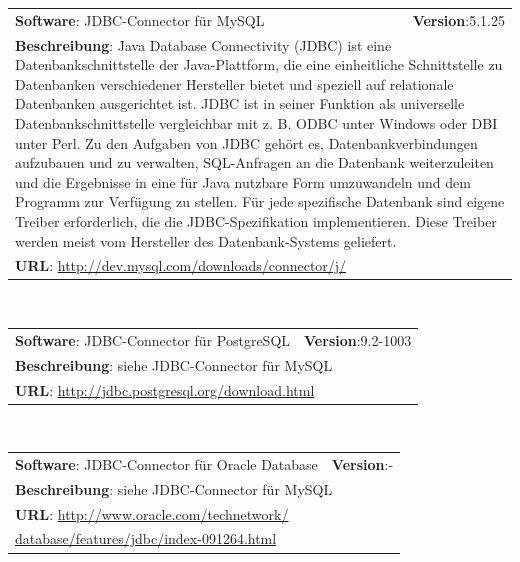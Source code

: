 \begin{tabular}{p{9cm}r}
\textbf{Software}: JDBC-Connector für MySQL  & \textbf{Version}:5.1.25\\
\multicolumn{2}{p{1\textwidth}}{\textbf{Beschreibung}: Java Database Connectivity (JDBC) ist eine Datenbankschnittstelle der Java-Plattform, die eine einheitliche Schnittstelle zu Datenbanken verschiedener Hersteller bietet und speziell auf relationale Datenbanken ausgerichtet ist. JDBC ist in seiner Funktion als universelle Datenbankschnittstelle vergleichbar mit z. B. ODBC unter Windows oder DBI unter Perl. Zu den Aufgaben von JDBC gehört es, Datenbankverbindungen aufzubauen und zu verwalten, SQL-Anfragen an die Datenbank weiterzuleiten und die Ergebnisse in eine für Java nutzbare Form umzuwandeln und dem Programm zur Verfügung zu stellen. Für jede spezifische Datenbank sind eigene Treiber erforderlich, die die JDBC-Spezifikation implementieren. Diese Treiber werden meist vom Hersteller des Datenbank-Systems geliefert.}\\
\multicolumn{2}{l}{\textbf{URL}: \url{http://dev.mysql.com/downloads/connector/j/}}
\end{tabular}\\

\begin{tabular}{p{9cm}r}
\textbf{Software}: JDBC-Connector für PostgreSQL  & \textbf{Version}:9.2-1003\\
\multicolumn{2}{p{1\textwidth}}{\textbf{Beschreibung}: siehe JDBC-Connector für MySQL}\\
\multicolumn{2}{l}{\textbf{URL}: \url{http://jdbc.postgresql.org/download.html}}
\end{tabular}\\

\begin{tabular}{p{9cm}r}
\textbf{Software}: JDBC-Connector für Oracle Database & \textbf{Version}:-\\
\multicolumn{2}{p{1\textwidth}}{\textbf{Beschreibung}: siehe JDBC-Connector für MySQL}\\
\multicolumn{2}{l}{\textbf{URL}: \url{http://www.oracle.com/technetwork/}}\\
\multicolumn{2}{l}{\url{database/features/jdbc/index-091264.html}}

\end{tabular}\\